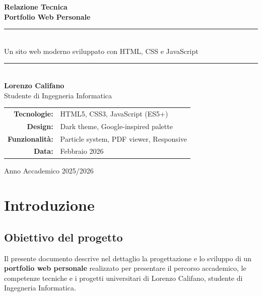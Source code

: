 \documentclass[a4paper,12pt]{report}
\begin{document}
\begin{titlepage}
    \centering
    \vspace*{2cm}

    {\Huge\bfseries\color{googleblue} Relazione Tecnica}\\[0.5cm]
    {\LARGE\bfseries Portfolio Web Personale}\\[1.5cm]

    \rule{\textwidth}{1pt}\\[0.4cm]
    {\large Un sito web moderno sviluppato con HTML, CSS e JavaScript}\\[0.2cm]
    \rule{\textwidth}{1pt}\\[2cm]

    {\Large\textbf{Lorenzo Califano}}\\[0.3cm]
    {\large Studente di Ingegneria Informatica}\\[2cm]

    \begin{tabular}{rl}
        \textbf{Tecnologie:} & HTML5, CSS3, JavaScript (ES5+) \\
        \textbf{Design:} & Dark theme, Google-inspired palette \\
        \textbf{Funzionalit\`a:} & Particle system, PDF viewer, Responsive \\
        \textbf{Data:} & Febbraio 2026 \\
    \end{tabular}

    \vfill
    {\small Anno Accademico 2025/2026}
\end{titlepage}

\tableofcontents
\newpage

\chapter{Introduzione}

\section{Obiettivo del progetto}

Il presente documento descrive nel dettaglio la progettazione e lo sviluppo di un \textbf{portfolio web personale} realizzato per presentare il percorso accademico, le competenze tecniche e i progetti universitari di Lorenzo Califano, studente di Ingegneria Informatica.
\end{document}
